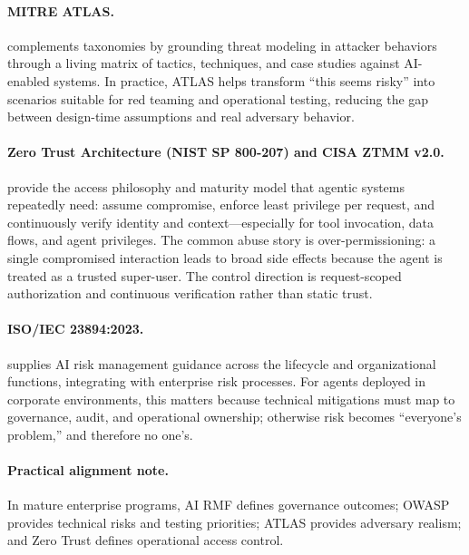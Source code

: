 \begin{TNtwocol}
  \paragraph{MITRE ATLAS.} complements taxonomies by grounding threat modeling in attacker behaviors through a living matrix of tactics, techniques, and case studies against AI-enabled systems. In practice, ATLAS helps transform “this seems risky” into scenarios suitable for red teaming and operational testing, reducing the gap between design-time assumptions and real adversary behavior. \cite{mitre-atlas,owasp-top10-llm-2025}

  \paragraph{Zero Trust Architecture (NIST SP 800-207) and CISA ZTMM v2.0.} provide the access philosophy and maturity model that agentic systems repeatedly need: assume compromise, enforce least privilege per request, and continuously verify identity and context—especially for tool invocation, data flows, and agent privileges. The common abuse story is over-permissioning: a single compromised interaction leads to broad side effects because the agent is treated as a trusted super-user. The control direction is request-scoped authorization and continuous verification rather than static trust. \cite{nist-sp800-207,cisa-ztmm-v2}

  \paragraph{ISO/IEC 23894:2023.} supplies AI risk management guidance across the lifecycle and organizational functions, integrating with enterprise risk processes. For agents deployed in corporate environments, this matters because technical mitigations must map to governance, audit, and operational ownership; otherwise risk becomes “everyone's problem,” and therefore no one's. \cite{iso-iec-23894,en-standard-iso23894,globalspec-iso23894}

  \medskip

  \paragraph{Practical alignment note.} In mature enterprise programs, AI RMF defines governance outcomes; OWASP provides technical risks and testing priorities; ATLAS provides adversary realism; and Zero Trust defines operational access control. \cite{nist-airmf-100-1,owasp-top10-llm-2025,mitre-atlas,nist-sp800-207}


\end{TNtwocol}
